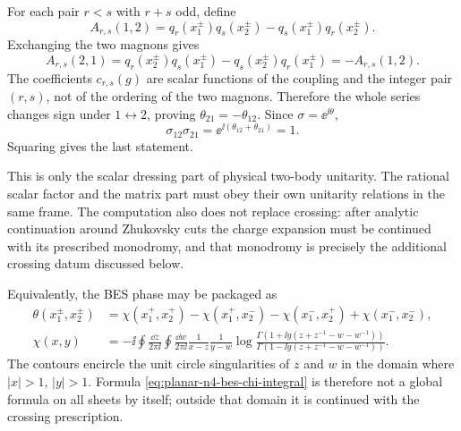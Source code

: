 For each pair \(r<s\) with \(r+s\) odd, define
\[
  A_{r,s}(1,2)
  =
  q_r(x_1^\pm)q_s(x_2^\pm)-q_s(x_1^\pm)q_r(x_2^\pm).
\]
Exchanging the two magnons gives
\[
  A_{r,s}(2,1)
  =
  q_r(x_2^\pm)q_s(x_1^\pm)-q_s(x_2^\pm)q_r(x_1^\pm)
  =
  -A_{r,s}(1,2).
\]
The coefficients \(c_{r,s}(g)\) are scalar functions of the coupling and the
integer pair \((r,s)\), not of the ordering of the two magnons.  Therefore the
whole series changes sign under \(1\leftrightarrow2\), proving
\(\theta_{21}=-\theta_{12}\).  Since \(\sigma=\ee^{\ii\theta}\),
\[
  \sigma_{12}\sigma_{21}
  =
  \ee^{\ii(\theta_{12}+\theta_{21})}
  =
  1.
\]
Squaring gives the last statement.

This is only the scalar dressing part of physical two-body unitarity.  The
rational scalar factor and the matrix part must obey their own unitarity
relations in the same frame.  The computation also does not replace crossing:
after analytic continuation around Zhukovsky cuts the charge expansion must be
continued with its prescribed monodromy, and that monodromy is precisely the
additional crossing datum discussed below.

Equivalently, the BES phase may be packaged as
\begin{equation}
\begin{aligned}
  \theta(x_1^\pm,x_2^\pm)
  &=
  \chi(x_1^+,x_2^+)-\chi(x_1^+,x_2^-)
  -\chi(x_1^-,x_2^+)+\chi(x_1^-,x_2^-),\\
  \chi(x,y)
  &=
  -\ii
  \oint\frac{\dd z}{2\pi\ii}
  \oint\frac{\dd w}{2\pi\ii}
  \frac{1}{x-z}\frac{1}{y-w}
  \log
  \frac{\Gamma\!\left(1+\ii g(z+z^{-1}-w-w^{-1})\right)}
       {\Gamma\!\left(1-\ii g(z+z^{-1}-w-w^{-1})\right)} .
\end{aligned}
  \label{eq:planar-n4-bes-chi-integral}
\end{equation}
The contours encircle the unit circle singularities of \(z\) and \(w\) in the
domain where \(|x|>1\), \(|y|>1\).  Formula
\eqref{eq:planar-n4-bes-chi-integral} is therefore not a global formula on
all sheets by itself; outside that domain it is continued with the crossing
prescription.

